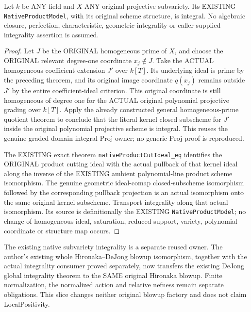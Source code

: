 \begin{theorem}
\label{thm:actual-native-polynomial-product-integral}
\leanok
{}
Let $k$ be ANY field and $X$ ANY original projective subvariety. Its EXISTING
\texttt{NativeProductModel}, with its original scheme structure, is integral.
No algebraic closure, perfection, characteristic, geometric integrality or
caller-supplied integrality assertion is assumed.
\end{theorem}
\begin{proof}
Let $J$ be the ORIGINAL homogeneous prime of $X$, and choose the ORIGINAL
relevant degree-one coordinate $x_j\notin J$. Take the ACTUAL homogeneous
coefficient extension $J'$ over $k[T]$. Its underlying ideal is prime by
the preceding theorem, and its original image coordinate $q(x_j)$ remains
outside $J'$ by the entire coefficient-ideal criterion. This original
coordinate is still homogeneous of degree one for the ACTUAL original
polynomial projective grading over $k[T]$.
Apply the already constructed general homogeneous-prime quotient theorem
to conclude that the literal kernel closed subscheme for $J'$ inside the
original polynomial projective scheme is integral. This reuses the genuine
graded-domain integral-Proj owner; no generic Proj proof is reproduced.

The EXISTING exact theorem \texttt{nativeProductCutIdeal\_eq} identifies
the ORIGINAL product cutting ideal with the actual pullback of that kernel
ideal along the inverse of the EXISTING ambient polynomial-line product
scheme isomorphism. The genuine geometric ideal-comap closed-subscheme
isomorphism followed by the corresponding pullback projection is an actual
isomorphism onto the same original kernel subscheme. Transport integrality
along that actual isomorphism. Its source is definitionally the EXISTING
\texttt{NativeProductModel}; no change of homogeneous ideal, saturation,
reduced support, variety, polynomial coordinate or structure map occurs.
\end{proof}

The existing native subvariety integrality is a separate reused owner.
The author's existing whole Hironaka--DeJong blowup isomorphism, together
with the actual integrality consumer proved separately, now transfers the
existing DeJong global integrality theorem to the SAME original Hironaka
blowup. Finite normalization, the normalized action and relative nefness
remain separate obligations. This slice changes neither original blowup
factory and does not claim LocalPositivity.
